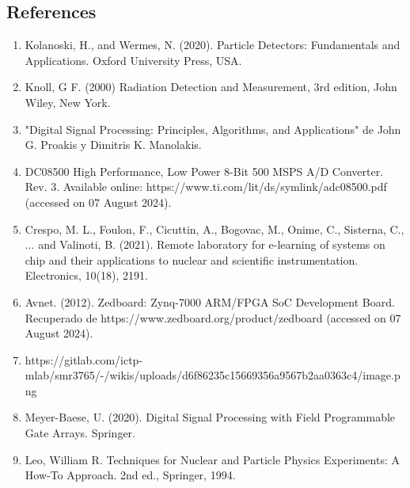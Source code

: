 \documentclass[]{book}
\begin{document}
\subsection*{References}
\begin{enumerate}

    \item Kolanoski, H., and Wermes, N. (2020). Particle Detectors: Fundamentals and Applications. Oxford University Press, USA.
    \item Knoll, G F. (2000) Radiation Detection and Measurement, 3rd edition, John Wiley, New
    York.
    \item "Digital Signal Processing: Principles, Algorithms, and Applications" de John G. Proakis y Dimitris K. Manolakis.
    \item DC08500 High Performance, Low Power 8-Bit 500 MSPS A/D Converter. Rev. 3. Available online: https://www.ti.com/lit/ds/symlink/adc08500.pdf (accessed on 07 August 2024).
    \item Crespo, M. L., Foulon, F., Cicuttin, A., Bogovac, M., Onime, C., Sisterna, C., ... and Valinoti, B. (2021). Remote laboratory for e-learning of systems on chip and their applications to nuclear and scientific instrumentation. Electronics, 10(18), 2191.
    \item Avnet. (2012). Zedboard: Zynq-7000 ARM/FPGA SoC Development Board. Recuperado de https://www.zedboard.org/product/zedboard (accessed on 07 August 2024).
    \item https://gitlab.com/ictp-mlab/smr3765/-/wikis/uploads/d6f86235c15669356a9567b2aa0363c4/image.png
    \item Meyer-Baese, U. (2020). Digital Signal Processing with Field Programmable Gate Arrays. Springer.
    \item Leo, William R. Techniques for Nuclear and Particle Physics Experiments: A How-To Approach. 2nd ed., Springer, 1994.
\end{enumerate}
\end{document}
